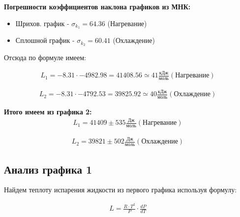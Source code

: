 \documentclass[a4paper, 12pt]{article}
\begin{document}
\noindent \textbf{Погрешности коэффициентов наклона графиков из МНК:}
\begin{itemize}
	\item Шрихов. график - $\sigma_{k_1} = 64.36$ (Нагревание)
	\item Сплошной график - $\sigma_{k_2} = 60.41$ (Охлаждение)
\end{itemize}

Отсюда по формуле имеем:

 	\begin{equation}
 		\begin{aligned}
 			 	 L_1 = - 8.31 \cdot -4982.98 = 41408.56 \simeq 41 \frac{ \text{кДж}}{ \text{моль}}  (\text{Нагревание})
 		\end{aligned} 
 	\end{equation}
 
  	\begin{equation}
 	\begin{aligned}
 		L_2 = - 8.31 \cdot -4792.53 = 39825.92 \simeq 40 \frac{ \text{кДж}}{ \text{моль}}   (\text{Охлаждение})
 	\end{aligned} 
 \end{equation}
	
\noindent \textbf{Итого имеем из графика 2:}
 	\begin{equation}
	\begin{aligned}
		L_1 = 41409 \pm 535 \frac{ \text{Дж}}{ \text{моль}}  (\text{Нагревание})
	\end{aligned} 
\end{equation}

\begin{equation}
	\begin{aligned}
		L_2 =  39821 \pm 502 \frac{ \text{Дж}}{ \text{моль}}   (\text{Охлаждение})
	\end{aligned} 
\end{equation}

\subsection[График 1]{Анализ графика 1}	

Найдем теплоту испарения жидкости из первого графика используя формулу:

\begin{equation}
	\begin{aligned}
		L = \frac{R \cdot T^{2}}{P} \cdot \frac{dP}{dT}
	\end{aligned}
\end{equation}
\end{document}
